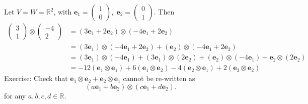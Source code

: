 \begin{example} 
Let \(V = W = {\mathbb{R}}^2\), with
\({\mathbf{e}}_1 = \left( \begin{array}{l} 1 \\  0 \end{array}\right) ,\;{\mathbf{e}}_2 = \left( \begin{array}{l} 0 \\  1 \end{array}\right) .
\)
Then
\begin{align*}
\left( \begin{array}{l} 3 \\  1 \end{array}\right)  \otimes  \left( \begin{matrix}  - 4 \\  2 \end{matrix}\right)  &= \left( {3{\mathbf{e}}_1 + 2{\mathbf{e}}_2}\right)  \otimes  \left( {-4{\mathbf{e}}_1 + 2{\mathbf{e}}_2}\right)
\\
&= \left( {3{\mathbf{e}}_1}\right)  \otimes  \left( {-4{\mathbf{e}}_1 + 2{\mathbf{e}}_2}\right)  + \left( {\mathbf{e}}_2\right)  \otimes  \left( {-4{\mathbf{e}}_1 + 2{\mathbf{e}}_2}\right)
\\
&= \left( {3{\mathbf{e}}_1}\right)  \otimes  \left( {-4{\mathbf{e}}_1}\right)  + \left( {3{\mathbf{e}}_1}\right)  \otimes  \left( {2{\mathbf{e}}_2}\right)  + \left( {\mathbf{e}}_2\right)  \otimes  \left( {-4{\mathbf{e}}_1}\right)  + {\mathbf{e}}_2 \otimes  \left( {2{\mathbf{e}}_2}\right)
\\
&=  - {12}\left( {{\mathbf{e}}_1 \otimes  {\mathbf{e}}_1}\right)  + 6\left( {{\mathbf{e}}_1 \otimes  {\mathbf{e}}_2}\right)  - 4\left( {{\mathbf{e}}_2 \otimes  {\mathbf{e}}_1}\right)  + 2\left( {{\mathbf{e}}_2 \otimes  {\mathbf{e}}_2}\right)
\end{align*}
Exercise: Check that \({\mathbf{e}}_1 \otimes  {\mathbf{e}}_2 + {\mathbf{e}}_2 \otimes  {\mathbf{e}}_1\) cannot be re-written as
\[
\left( {a{\mathbf{e}}_1 + b{\mathbf{e}}_2}\right)  \otimes  \left( {c{\mathbf{e}}_1 + d{\mathbf{e}}_2}\right).
\]
for any $a,b,c,d \in  \mathbb{R}$.
\end{example}

